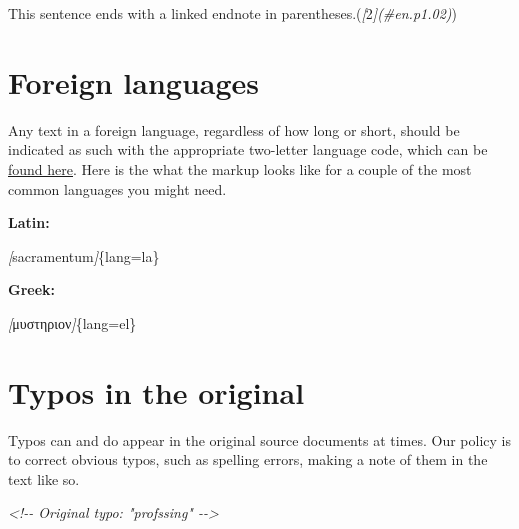\documentclass[
]{book}
\newenvironment{Shaded}{\begin{snugshade}}{\end{snugshade}}
\newcommand{\CommentTok}[1]{\textcolor[rgb]{0.56,0.35,0.01}{\textit{#1}}}
\newcommand{\NormalTok}[1]{#1}
\newcommand{\OtherTok}[1]{\textcolor[rgb]{0.56,0.35,0.01}{#1}}
\begin{document}
\begin{Shaded}
\begin{Highlighting}[]
\NormalTok{This sentence ends with a linked endnote in parentheses.(}\CommentTok{[}\OtherTok{2}\CommentTok{](\#en.p1.02)}\NormalTok{)}
\end{Highlighting}
\end{Shaded}

\hypertarget{foreign-languages}{%
\chapter{Foreign languages}\label{foreign-languages}}

Any text in a foreign language, regardless of how long or short, should be indicated as such with the appropriate two-letter language code, which can be \href{https://www.w3schools.com/tags/ref_language_codes.asp}{found here}. Here is the what the markup looks like for a couple of the most common languages you might need.

\textbf{Latin:}

\begin{Shaded}
\begin{Highlighting}[]
\CommentTok{[}\OtherTok{sacramentum}\CommentTok{]}\NormalTok{\{lang=la\}}
\end{Highlighting}
\end{Shaded}

\textbf{Greek:}

\begin{Shaded}
\begin{Highlighting}[]
\CommentTok{[}\OtherTok{μυστηριον}\CommentTok{]}\NormalTok{\{lang=el\}}
\end{Highlighting}
\end{Shaded}

\hypertarget{typos-in-the-original}{%
\chapter{Typos in the original}\label{typos-in-the-original}}

Typos can and do appear in the original source documents at times. Our policy is to correct obvious typos, such as spelling errors, making a note of them in the text like so.

\begin{Shaded}
\begin{Highlighting}[]
\CommentTok{\textless{}!{-}{-} Original typo: "profssing" {-}{-}\textgreater{}}
\end{Highlighting}
\end{Shaded}
\end{document}
